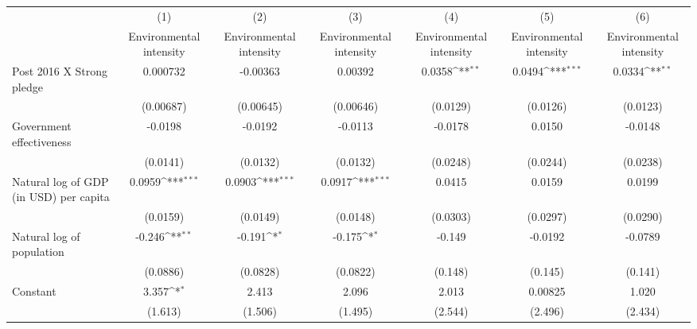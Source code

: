 {
\def\sym#1{\ifmmode^{#1}\else\(^{#1}\)\fi}
\begin{tabular}{l*{6}{c}}
\hline\hline
                    &\multicolumn{1}{c}{(1)}&\multicolumn{1}{c}{(2)}&\multicolumn{1}{c}{(3)}&\multicolumn{1}{c}{(4)}&\multicolumn{1}{c}{(5)}&\multicolumn{1}{c}{(6)}\\
                    &\multicolumn{1}{c}{Environmental intensity}&\multicolumn{1}{c}{Environmental intensity}&\multicolumn{1}{c}{Environmental intensity}&\multicolumn{1}{c}{Environmental intensity}&\multicolumn{1}{c}{Environmental intensity}&\multicolumn{1}{c}{Environmental intensity}\\
\hline
Post 2016 X Strong pledge&    0.000732         &    -0.00363         &     0.00392         &      0.0358\sym{**} &      0.0494\sym{***}&      0.0334\sym{**} \\
                    &   (0.00687)         &   (0.00645)         &   (0.00646)         &    (0.0129)         &    (0.0126)         &    (0.0123)         \\
[1em]
Government effectiveness&     -0.0198         &     -0.0192         &     -0.0113         &     -0.0178         &      0.0150         &     -0.0148         \\
                    &    (0.0141)         &    (0.0132)         &    (0.0132)         &    (0.0248)         &    (0.0244)         &    (0.0238)         \\
[1em]
Natural log of GDP (in USD) per capita&      0.0959\sym{***}&      0.0903\sym{***}&      0.0917\sym{***}&      0.0415         &      0.0159         &      0.0199         \\
                    &    (0.0159)         &    (0.0149)         &    (0.0148)         &    (0.0303)         &    (0.0297)         &    (0.0290)         \\
[1em]
Natural log of population&      -0.246\sym{**} &      -0.191\sym{*}  &      -0.175\sym{*}  &      -0.149         &     -0.0192         &     -0.0789         \\
                    &    (0.0886)         &    (0.0828)         &    (0.0822)         &     (0.148)         &     (0.145)         &     (0.141)         \\
[1em]
Constant            &       3.357\sym{*}  &       2.413         &       2.096         &       2.013         &     0.00825         &       1.020         \\
                    &     (1.613)         &     (1.506)         &     (1.495)         &     (2.544)         &     (2.496)         &     (2.434)         \\

\end{tabular}}
